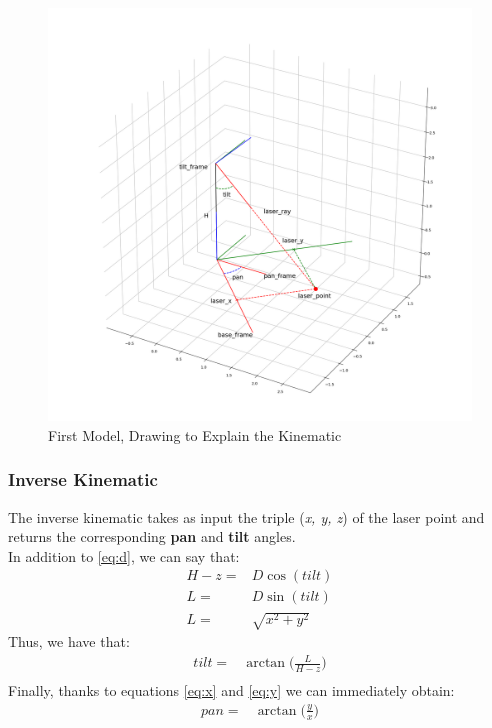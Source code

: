 \begin{figure}
	\centering
	\includegraphics[width=\textwidth]{img/model1XY.png}%
	\caption{First Model, Drawing to Explain the Kinematic}
	\label{fig:firstModelPanTilt}
\end{figure}
\subsubsection{Inverse Kinematic}
The inverse kinematic takes as input the triple (\textit{x, y, z}) of the laser point and returns the corresponding \textbf{pan} and \textbf{tilt} angles.\\
In addition to \ref{eq:d}, we can say that:
\begin{align}
    H-z =& D\cos(tilt)\\
	L =& D\sin(tilt) \label{eq:dsin}\\
	L=& \sqrt{x^2+y^2}
\end{align}
Thus, we have that:
\begin{align}
    tilt =& \arctan\bigg(\frac{L}{H-z}\bigg) \label{eq:tiltik}\\
\end{align}
Finally, thanks to equations \ref{eq:x} and \ref{eq:y} we can immediately obtain:
\begin{align}
	pan=& \arctan\bigg(\frac{y}{x}\bigg)\label{eq:panik}
\end{align}

